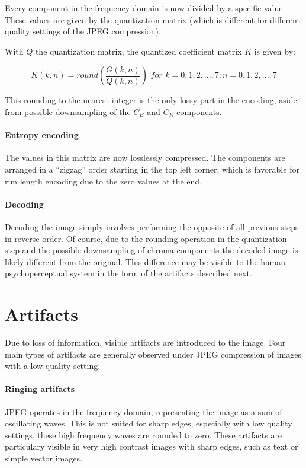 Every component in the frequency domain is now divided by a specific value. These values are given by the quantization matrix (which is different for different quality settings of the JPEG compression).

With $Q$ the quantization matrix, the quantized coefficient matrix $K$ is given by:

$$
K(k,n) = \textit{round} (\frac{G(k,n)}{Q(k,n)}) \textit{ for } k=0,1,2,...,7; n=0,1,2,...,7
$$

This rounding to the nearest integer is the only lossy part in the encoding, aside from possible downsampling of the $C_B$ and $C_R$ components.

\paragraph{Entropy encoding}
The values in this matrix are now losslessly compressed. The components are arranged in a ``zigzag'' order starting in the top left corner, which is favorable for run length encoding due to the zero values at the end. 


\paragraph{Decoding}
Decoding the image simply involves performing the opposite of all previous steps in reverse order. Of course, due to the rounding operation in the quantization step and the possible downsampling of chroma components the decoded image is likely different from the original. This difference may be visible to the human psychoperceptual system in the form of the artifacts described next.

\section{Artifacts}
Due to loss of information, visible artifacts are introduced to the image. Four main types of artifacts are generally observed under JPEG compression of images with a low quality setting. 

\paragraph{Ringing artifacts}
JPEG operates in the frequency domain, representing the image as a sum of oscillating waves. This is not suited for sharp edges, especially with low quality settings, these high frequency waves are rounded to zero. These artifacts are particulary visible in very high contrast images with sharp edges, such as text or simple vector images.

